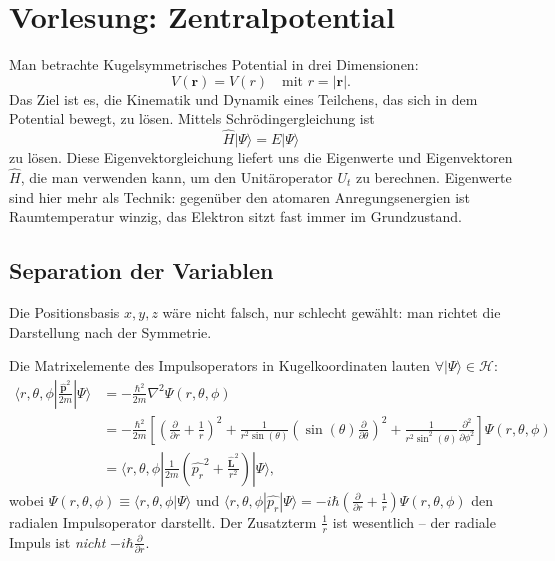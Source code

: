 
\section{Vorlesung: Zentralpotential}
Man betrachte Kugelsymmetrisches Potential in drei Dimensionen:
\begin{equation}
	V(\mathbf{r}) = V(r) \quad\text{mit $r = |\mathbf{r}|$.}
\end{equation}
Das Ziel ist es, die Kinematik und Dynamik eines Teilchens, das sich in dem Potential bewegt, zu lösen. Mittels Schrödingergleichung ist
\begin{equation}
	\widehat{H}|\Psi\rangle = E|\Psi\rangle
\end{equation}
zu lösen. Diese Eigenvektorgleichung liefert uns die Eigenwerte und Eigenvektoren $\widehat{H}$, die man verwenden kann, um den Unitäroperator $U_t$ zu berechnen. Eigenwerte sind hier mehr als Technik: gegenüber den atomaren Anregungsenergien ist Raumtemperatur winzig, das Elektron sitzt fast immer im Grundzustand.

\subsection{Separation der Variablen}
Die Positionsbasis $x,y,z$ wäre nicht falsch, nur schlecht gewählt: man richtet die Darstellung nach der Symmetrie.

Die Matrixelemente des Impulsoperators in Kugelkoordinaten lauten $\forall |\Psi\rangle \in \mathcal{H}$:
\begin{equation}
	\begin{split}
		\langle r,\theta,\phi|\frac{\widehat{\mathbf{p}}^2}{2m}|\Psi\rangle &= -\frac{\hbar^2}{2m}\nabla^2 \Psi(r,\theta,\phi) \\
		&= -\frac{\hbar^2}{2m} \left[\left(\frac{\partial}{\partial r} + \frac1r\right)^2 + \frac{1}{r^2\sin(\theta)}\left(\sin(\theta)\frac{\partial}{\partial \theta}\right)^2 +  \frac{1}{r^2\sin^2(\theta)}\frac{\partial^2}{\partial \phi^2}\right]\Psi(r,\theta,\phi) \\
		&= \langle r,\theta,\phi|\frac{1}{2m}\left(\widehat{p_r}^2 + \frac{\widehat{\mathbf{L}}^2}{r^2}\right)|\Psi\rangle,
	\end{split}
\end{equation}
wobei $\Psi(r,\theta,\phi) \equiv \langle r,\theta,\phi|\Psi\rangle$ und $\langle r,\theta,\phi|\widehat{p_r}|\Psi\rangle = -i\hbar \left(\frac{\partial}{\partial r} + \frac1r\right)\Psi(r,\theta,\phi)$ den radialen Impulsoperator darstellt. Der Zusatzterm $\frac1r$ ist wesentlich -- der radiale Impuls ist \emph{nicht} $-i\hbar\frac{\partial}{\partial r}$.

